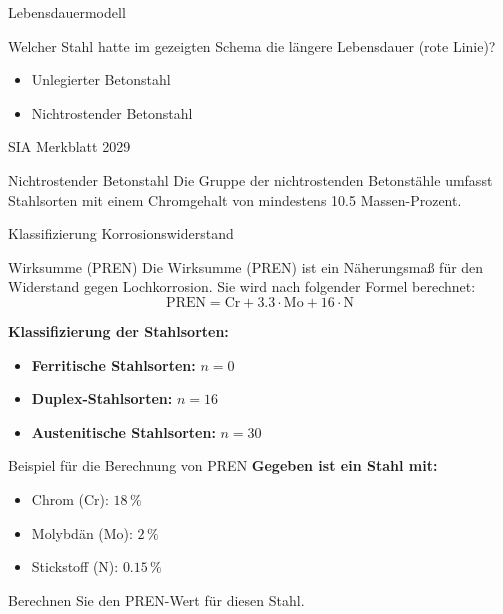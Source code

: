 \begin{frame}{Lebensdauermodell}
    \begin{Fragenblock}
        Welcher Stahl hatte im gezeigten Schema die längere Lebensdauer (rote Linie)?
        
        \begin{itemize}
            \item[\faSquare] Unlegierter Betonstahl
            \item[\textcolor{green!70!black}{\faCheckSquare}] Nichtrostender Betonstahl
        \end{itemize}
        
    \end{Fragenblock}
\end{frame}

\begin{frame}{SIA Merkblatt 2029}
    \begin{Definition_BS}{Nichtrostender Betonstahl}
        Die Gruppe der nichtrostenden Betonstähle umfasst Stahlsorten mit einem Chromgehalt von mindestens 10.5 Massen-Prozent.
    \end{Definition_BS}
\end{frame}

\begin{frame}{Klassifizierung Korrosionswiderstand}
    \begin{Definition_BS}{Wirksumme (PREN)}
        Die Wirksumme (PREN) ist ein Näherungsmaß für den Widerstand gegen Lochkorrosion. Sie wird nach folgender Formel berechnet:
        \begin{equation*}
            \text{PREN} = \text{Cr} + 3.3 \cdot \text{Mo} + 16 \cdot \text{N}
        \end{equation*}
    \end{Definition_BS}
    

    \textbf{Klassifizierung der Stahlsorten:}
    \begin{itemize}
        \item [\textbullet] \textbf{Ferritische Stahlsorten:} \( n = 0 \)
        \item [\textbullet] \textbf{Duplex-Stahlsorten:} \( n = 16 \)
        \item [\textbullet] \textbf{Austenitische Stahlsorten:} \( n = 30 \)
    \end{itemize}
\end{frame}



\begin{frame}{Beispiel für die Berechnung von PREN}
    \textbf{Gegeben ist ein Stahl mit:}
    \begin{itemize}
        \item Chrom (Cr): \( 18\,\% \)
        \item Molybdän (Mo): \( 2\,\% \)
        \item Stickstoff (N): \( 0.15\,\% \)
    \end{itemize}
    \hspace{20pt}
    \begin{Fragenblock}
        Berechnen Sie den PREN-Wert für diesen Stahl.
    \end{Fragenblock}
\end{frame}
    
